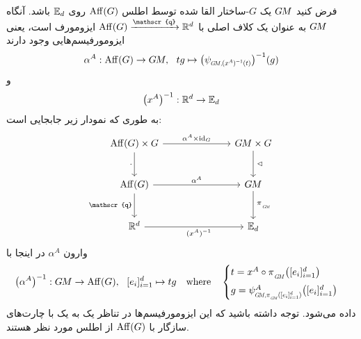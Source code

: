 \begin{thm}
	\label{thm:principal_bundle_isomorphism}
	فرض کنید $G\mkern-1.4muM$ یک $G$-ساختار القا شده توسط اطلس $\operatorname{Aff}(G)$ روی $\mathbb{E}_d$ باشد.
	آنگاه $G\mkern-1.4muM$ به عنوان یک کلاف اصلی با $\Aff(G) \xrightarrow{\mathscr{q}} \R^d$ ایزومورف است، یعنی ایزومورفیسم‌هایی وجود دارند
	\begin{align}\label{eq:principal_bundle_iso_AffG_GM}
		\alpha^A: \Aff(G) \to \GM,\ \ tg \mapsto \big( \psiGMxAinvt \big)^{-1}(g)
	\end{align}
	و
	\begin{align}
		\big( x^A \big)^{-1}: \mathbb{R}^d \to \mathbb{E}_d
	\end{align}
	به طوری که نمودار زیر جابجایی است:
	\begin{equation}\label{cd:GM_def_embedding}
		\begin{tikzcd}[row sep=2.5em, column sep=7.em]
			\Aff(G) \times G
			\arrow[r, "{\alpha^A \times \id_G}"]
			\arrow[d, "{\cdot}"']
			& \GM \times G
			\arrow[d, "{\,\lhd}"]
			\\
			\Aff(G)
			\arrow[r, pos=.5, "{\alpha^A}"]
			\arrow[d, "{\mathscr{q}}"']
			& \GM
			\arrow[d, "{\,\piGM}"]
			\\
			\R^d
			\arrow[r, pos=.55, "{(x^A)^{-1}}"']
			& \Euc_d
		\end{tikzcd}
	\end{equation}
	وارون $\alpha^A$ در اینجا با
	\begin{equation}
		\big(\alpha^A \big)^{-1}: \GM \to \Aff(G),\ \ [e_i]_{i=1}^d \mapsto tg
		\quad \textup{where} \quad
		\begin{cases}
			t = x^A \circ \piGM \big( [e_i]_{i=1}^d \big) \\[1ex]
			g = \psi_{\protect\scalebox{.6}{$G\!M,$}\protect\scalebox{.7}{$\piGM([e_i]_{i=1}^d)$}}^A \big( [e_i]_{i=1}^d \big)
		\end{cases}
	\end{equation}
	داده می‌شود. توجه داشته باشید که این ایزومورفیسم‌ها در تناظر یک به یک با چارت‌های سازگار با $\operatorname{Aff}(G)$ از اطلس مورد نظر هستند.
\end{thm}

